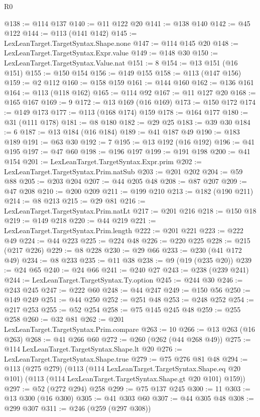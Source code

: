 \begin{lexlean}{R0}
\begin{coremodule}
@138 := @114 @137
@140 := @11 @122 @20
@141 := @138 @140
@142 := @45 @122
@144 := @113 (@141 @142)
@145 := LexLeanTarget.TargetSyntax.Shape.none
@147 := @114 @145 @20
@148 := LexLeanTarget.TargetSyntax.Expr.value
@149 := @148 @30
@150 := LexLeanTarget.TargetSyntax.Value.nat
@151 := 8
@154 := @13 @151 (@16 @151)
@155 := @150 @154
@156 := @149 @155
@158 := @113 (@147 @156)
@159 := @2 @112
@160 := @158 @159
@161 := @144 @160
@162 := @136 @161
@164 := @113 (@118 @162)
@165 := @114 @92
@167 := @11 @127 @20
@168 := @165 @167
@169 := 9
@172 := @13 @169 (@16 @169)
@173 := @150 @172
@174 := @149 @173
@177 := @113 (@168 @174) @159
@178 := @164 @177
@180 := @31 (@111 @178)
@181 := @8 @180
@182 := @29 @25
@183 := @39 @30
@184 := 6
@187 := @13 @184 (@16 @184)
@189 := @41 @187 @49
@190 := @183 @189
@191 := @63 @30
@192 := 7
@195 := @13 @192 (@16 @192)
@196 := @41 @195
@197 := @47 @60
@198 := @196 @197
@199 := @191 @198
@200 := @41 @154
@201 := LexLeanTarget.TargetSyntax.Expr.prim
@202 := LexLeanTarget.TargetSyntax.Prim.natSub
@203 := @201 @202
@204 := @59 @88
@205 := @203 @204
@207 := @44 @205 @48
@208 := @87 @207
@209 := @47 @208
@210 := @200 @209
@211 := @199 @210
@213 := @182 (@190 @211)
@214 := @8 @213
@215 := @29 @81
@216 := LexLeanTarget.TargetSyntax.Prim.natLt
@217 := @201 @216
@218 := @150 @18
@219 := @149 @218
@220 := @44 @219
@221 := LexLeanTarget.TargetSyntax.Prim.length
@222 := @201 @221
@223 := @222 @49
@224 := @44 @223
@225 := @224 @48
@226 := @220 @225
@228 := @215 (@217 @226)
@229 := @8 @228
@230 := @29 @66
@233 := @230 (@41 @172 @49)
@234 := @8 @233
@235 := @11 @38
@238 := @9 (@19 (@235 @20))
@239 := @24 @65
@240 := @24 @66
@241 := @240 @27
@243 := @238 (@239 @241)
@244 := LexLeanTarget.TargetSyntax.Ty.option
@245 := @244 @30
@246 := @243 @245
@247 := @222 @60
@248 := @44 @247
@249 := @150 @56
@250 := @149 @249
@251 := @44 @250
@252 := @251 @48
@253 := @248 @252
@254 := @217 @253
@255 := @52 @254
@258 := @75 @145 @245 @48
@259 := @255 @258
@260 := @32 @81
@262 := @201 LexLeanTarget.TargetSyntax.Prim.compare
@263 := 10
@266 := @13 @263 (@16 @263)
@268 := @41 @266 @60
@272 := @260 (@262 (@44 @268 @49))
@275 := @114 LexLeanTarget.TargetSyntax.Shape.lt @20
@276 := LexLeanTarget.TargetSyntax.Shape.true
@279 := @75 @276 @81 @48
@294 := @113
    (@275 @279)
    (@113
      (@114 LexLeanTarget.TargetSyntax.Shape.eq @20 @101)
      (@113 (@114 LexLeanTarget.TargetSyntax.Shape.gt @20 @101) @159))
@297 := @52 (@272 @294) @258
@299 := @75 @137 @245
@300 := 11
@303 := @13 @300 (@16 @300)
@305 := @41 @303 @60
@307 := @44 @305 @48
@308 := @299 @307
@311 := @246 (@259 (@297 @308))

\end{coremodule}
\end{lexlean}
